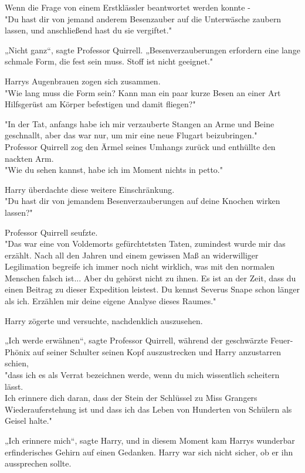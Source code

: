 {Wenn die Frage von einem Erstklässler beantwortet werden konnte -\\ "Du hast dir von jemand anderem Besenzauber auf die Unterwäsche zaubern lassen, und anschließend hast du sie vergiftet."

„Nicht ganz“, sagte Professor Quirrell. „Besenverzauberungen erfordern eine lange schmale Form, die fest sein muss. Stoff ist nicht geeignet."

Harrys Augenbrauen zogen sich zusammen.\\ "Wie lang muss die Form sein? Kann man ein paar kurze Besen an einer Art Hilfsgerüst am Körper befestigen und damit fliegen?"

"In der Tat, anfangs habe ich mir verzauberte Stangen an Arme und Beine geschnallt, aber das war nur, um mir eine neue Flugart beizubringen."\\ Professor Quirrell zog den Ärmel seines Umhangs zurück und enthüllte den nackten Arm.\\ "Wie du sehen kannst, habe ich im Moment nichts in petto."

Harry überdachte diese weitere Einschränkung.\\ "Du hast dir von jemandem Besenverzauberungen auf deine Knochen wirken lassen?"

Professor Quirrell seufzte.\\ "Das war eine von Voldemorts gefürchtetsten Taten, zumindest wurde mir das erzählt. Nach all den Jahren und einem gewissen Maß an widerwilliger Legilimation begreife ich immer noch nicht wirklich, was mit den normalen Menschen falsch ist... Aber du gehörst nicht zu ihnen. Es ist an der Zeit, dass du einen Beitrag zu dieser Expedition leistest. Du kennst Severus Snape schon länger als ich. Erzählen mir deine eigene Analyse dieses Raumes."

Harry zögerte und versuchte, nachdenklich auszusehen.

„Ich werde erwähnen“, sagte Professor Quirrell, während der geschwärzte Feuer-Phönix auf seiner Schulter seinen Kopf auszustrecken und Harry anzustarren schien,\\ "dass ich es als Verrat bezeichnen werde, wenn du mich wissentlich scheitern lässt.\\ Ich erinnere dich daran, dass der Stein der Schlüssel zu Miss Grangers Wiederauferstehung ist und dass ich das Leben von Hunderten von Schülern als Geisel halte."

„Ich erinnere mich“, sagte Harry, und in diesem Moment kam Harrys wunderbar erfinderisches Gehirn auf einen Gedanken. Harry war sich nicht sicher, ob er ihn aussprechen sollte.

}
